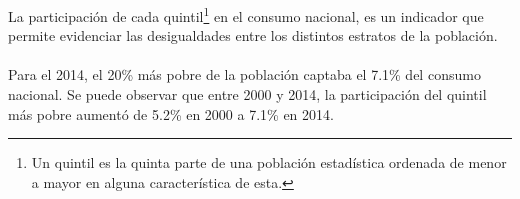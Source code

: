 La participación de cada quintil\footnote{Un quintil es la quinta parte de una población estadística ordenada de menor a mayor en alguna característica de esta.}  en el consumo nacional, es un indicador que permite evidenciar las  desigualdades entre los distintos estratos de la población. \\\\ 
Para el 2014, el 20\% más  pobre de la población captaba el 7.1\% del consumo nacional. Se puede observar que entre 2000 y 2014, la participación del quintil más pobre aumentó de 5.2\% en 2000 a 7.1\%  en 2014.